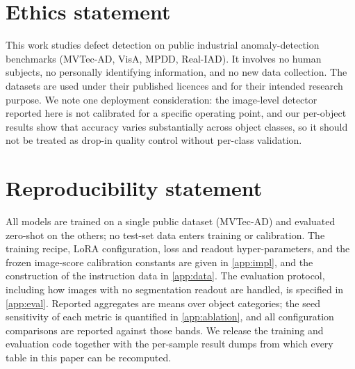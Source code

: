 \section*{Ethics statement}
This work studies defect detection on public industrial anomaly-detection
benchmarks (MVTec-AD, VisA, MPDD, Real-IAD). It involves no human subjects, no
personally identifying information, and no new data collection. The datasets are
used under their published licences and for their intended research purpose. We
note one deployment consideration: the image-level detector reported here is not
calibrated for a specific operating point, and our per-object results show that
accuracy varies substantially across object classes, so it should not be treated
as drop-in quality control without per-class validation.

\section*{Reproducibility statement}
All models are trained on a single public dataset (MVTec-AD) and evaluated
zero-shot on the others; no test-set data enters training or calibration. The
training recipe, LoRA configuration, loss and readout hyper-parameters, and the
frozen image-score calibration constants are given in \cref{app:impl}, and the
construction of the instruction data in \cref{app:data}. The evaluation protocol,
including how images with no segmentation readout are handled, is specified in
\cref{app:eval}. Reported aggregates are means over object categories; the seed
sensitivity of each metric is quantified in \cref{app:ablation}, and all
configuration comparisons are reported against those bands. We release the
training and evaluation code together with the per-sample result dumps from which
every table in this paper can be recomputed.
